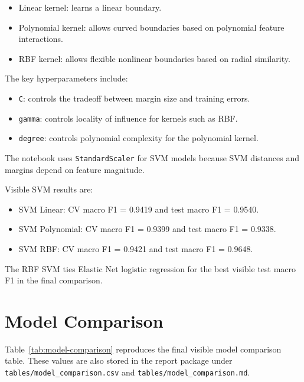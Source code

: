 \documentclass[11pt]{article}
\begin{document}
\begin{itemize}
  \item Linear kernel: learns a linear boundary.
  \item Polynomial kernel: allows curved boundaries based on polynomial feature interactions.
  \item RBF kernel: allows flexible nonlinear boundaries based on radial similarity.
\end{itemize}

The key hyperparameters include:

\begin{itemize}
  \item \texttt{C}: controls the tradeoff between margin size and training errors.
  \item \texttt{gamma}: controls locality of influence for kernels such as RBF.
  \item \texttt{degree}: controls polynomial complexity for the polynomial kernel.
\end{itemize}

The notebook uses \texttt{StandardScaler} for SVM models because SVM distances and margins depend on feature magnitude.

Visible SVM results are:

\begin{itemize}
  \item SVM Linear: CV macro F1 = 0.9419 and test macro F1 = 0.9540.
  \item SVM Polynomial: CV macro F1 = 0.9399 and test macro F1 = 0.9338.
  \item SVM RBF: CV macro F1 = 0.9421 and test macro F1 = 0.9648.
\end{itemize}

The RBF SVM ties Elastic Net logistic regression for the best visible test macro F1 in the final comparison.

\section{Model Comparison}

Table~\ref{tab:model-comparison} reproduces the final visible model comparison table. These values are also stored in the report package under \texttt{tables/model\_comparison.csv} and \texttt{tables/model\_comparison.md}.
\end{document}
